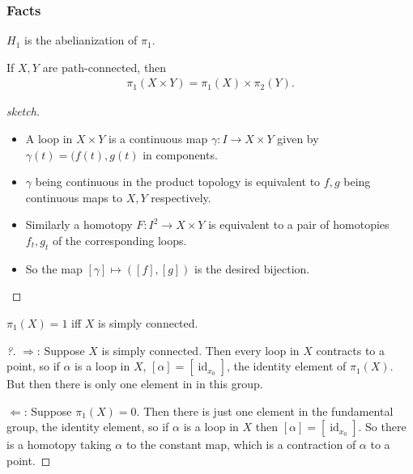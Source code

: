 \hypertarget{facts}{%
\subsubsection{Facts}\label{facts}}

\begin{fact}

\(H_{1}\) is the abelianization of \(\pi_{1}\).

\end{fact}

\begin{proposition}

If \(X, Y\) are path-connected, then
\begin{align*}
\pi_1 (X \times Y) = \pi_1(X) \times\pi_2(Y)
.\end{align*}

\end{proposition}

\begin{proof}[sketch]

\envlist

\begin{itemize}
\tightlist
\item
  A loop in \(X \times Y\) is a continuous map
  \(\gamma : I \xrightarrow{} X \times Y\) given by
  \(\gamma (t) = (f(t), g(t)\) in components.
\item
  \(\gamma\) being continuous in the product topology is equivalent to
  \(f, g\) being continuous maps to \(X, Y\) respectively.
\item
  Similarly a homotopy \(F: I^2 \to X \times Y\) is equivalent to a pair
  of homotopies \(f_t, g_t\) of the corresponding loops.
\item
  So the map \([ \gamma ] \mapsto ([f], [g])\) is the desired bijection.
\end{itemize}

\end{proof}

\begin{proposition}

\(\pi_{1}(X) = 1\) iff \(X\) is simply connected.

\end{proposition}

\begin{proof}[?]

\(\Rightarrow\): Suppose \(X\) is simply connected. Then every loop in
\(X\) contracts to a point, so if \(\alpha\) is a loop in \(X\),
\([\alpha] = [\operatorname{id}_{x_{0}}]\), the identity element of
\(\pi_{1}(X)\). But then there is only one element in in this group.

\(\Leftarrow\): Suppose \(\pi_{1}(X) = 0\). Then there is just one
element in the fundamental group, the identity element, so if \(\alpha\)
is a loop in \(X\) then \([\alpha] = [\operatorname{id}_{x_{0}}]\). So
there is a homotopy taking \(\alpha\) to the constant map, which is a
contraction of \(\alpha\) to a point.

\end{proof}

